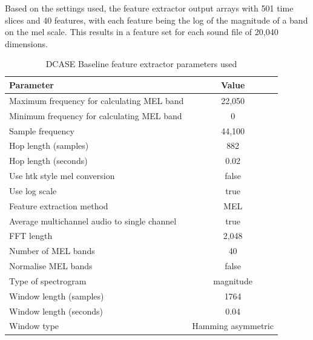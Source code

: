 \documentclass[11pt]{article}
\begin{document}
Based on the settings used, the feature extractor output arrays with 501 time slices and 40 features, with each feature being the log of the magnitude of a band on the mel scale. This results in a feature set for each sound file of 20,040 dimensions.

\begin{table}
	\centering
	\caption{DCASE Baseline feature extractor parameters used}
	\label{tab:featExParam}
	\begin{tabularx}{0.76\textwidth}{l c}
		\toprule
		\textbf{Parameter}                           & \textbf{Value}     \\ \midrule
		Maximum frequency for calculating MEL band   & 22,050             \\
		Minimum frequency for calculating MEL band   & 0                  \\
		Sample frequency                             & 44,100             \\
		Hop length (samples)                         & 882                \\
		Hop length (seconds)                         & 0.02               \\
		Use htk style mel conversion                 & false              \\
		Use log scale                                & true               \\
		Feature extraction method                    & MEL                \\
		Average multichannel audio to single channel & true               \\
		FFT length                                   & 2,048              \\
		Number of MEL bands                          & 40                 \\
		Normalise MEL bands                          & false              \\
		Type of spectrogram                          & magnitude          \\
		Window length (samples)                      & 1764               \\
		Window length (seconds)                      & 0.04               \\
		Window type                                  & Hamming asymmetric \\ \bottomrule
	\end{tabularx}
\end{table}
\end{document}
